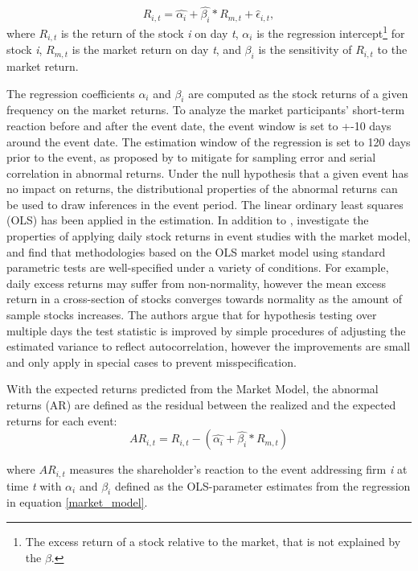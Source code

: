\begin{equation} \label{market_model}
    R_{i,t} = \hat{\alpha_i} + \hat{\beta_i} * R_{m,t} + \hat{\epsilon}_{i,t},
\end{equation}
 where $R_{i,t}$ is the return of the stock \textit{i} on day \textit{t}, $\alpha_i$ is the regression intercept\footnote{The excess return of a stock relative to the market, that is not explained by the $\beta$.} for stock \textit{i}, $R_{m,t}$ is the market return on day \textit{t}, and
 $\beta_i$ is the sensitivity of $R_{i,t}$ to the market return.  

 The regression coefficients $\alpha_i$ and $\beta_i$ are computed as the stock returns of a given frequency on the market returns. To analyze the market participants' short-term reaction before and after the event date, the event window is set to +-10 days around the event date. The estimation window of the regression is set to 120 days prior to the event, as proposed by \cite{Event_studies} to mitigate for sampling error and serial correlation in abnormal returns. Under the null hypothesis that a given event has no impact on returns, the distributional properties of the abnormal returns can be used to draw inferences in the event period. 
 The linear ordinary least squares (OLS) has been applied in the estimation. In addition to \cite{Event_studies},\cite{brown1985using} investigate the properties of applying daily stock returns in event studies with the market model, and find that methodologies based on the OLS market model using standard parametric tests are well-specified under a variety of conditions. For example, daily excess returns may suffer from non-normality, however the mean excess return in a cross-section of stocks converges towards normality as the amount of sample stocks increases. The authors argue that for hypothesis testing over multiple days the test statistic is improved by simple procedures of adjusting the estimated variance to reflect autocorrelation, however the improvements are small and only apply in special cases to prevent misspecification. 

 With the expected returns predicted from the Market Model, the abnormal returns (AR) are defined as the residual between the realized and the expected returns for each event:
 \begin{equation}
    AR_{i,t} = R_{i,t} - (\hat{\alpha_i} + \hat{\beta_i} * R_{m,t})
 \end{equation}

 where $AR_{i,t}$ measures the shareholder's reaction to the event addressing firm \textit{i} at time \textit{t}  with $\alpha_i$ and $\beta_i$ defined as the OLS-parameter estimates from the regression in equation \ref{market_model}.
  
